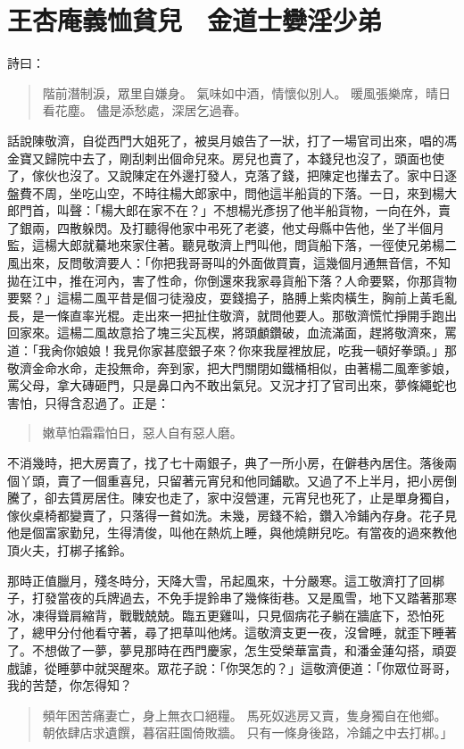 
\chapter{王杏庵義恤貧兒　金道士孌淫少弟}

詩曰：
\begin{quote}
階前潛制淚，眾里自嫌身。
氣味如中酒，情懷似別人。
暖風張樂席，晴日看花塵。
儘是添愁處，深居乞過春。
\end{quote}

話說陳敬濟，自從西門大姐死了，被吳月娘告了一狀，打了一場官司出來，唱的馮金寶又歸院中去了，剛刮剌出個命兒來。房兒也賣了，本錢兒也沒了，頭面也使了，傢伙也沒了。又說陳定在外邊打發人，克落了錢，把陳定也攆去了。家中日逐盤費不周，坐吃山空，不時往楊大郎家中，問他這半船貨的下落。一日，來到楊大郎門首，叫聲：「楊大郎在家不在？」不想楊光彥拐了他半船貨物，一向在外，賣了銀兩，四散躲閃。及打聽得他家中弔死了老婆，他丈母縣中告他，坐了半個月監，這楊大郎就驀地來家住著。聽見敬濟上門叫他，問貨船下落，一徑使兄弟楊二風出來，反問敬濟要人：「你把我哥哥叫的外面做買賣，這幾個月通無音信，不知拋在江中，推在河內，害了性命，你倒還來我家尋貨船下落？人命要緊，你那貨物要緊？」這楊二風平昔是個刁徒潑皮，耍錢搗子，胳膊上紫肉橫生，胸前上黃毛亂長，是一條直率光棍。走出來一把扯住敬濟，就問他要人。那敬濟慌忙掙開手跑出回家來。這楊二風故意拾了塊三尖瓦楔，將頭顱鑽破，血流滿面，趕將敬濟來，罵道：「我肏你娘娘！我見你家甚麼銀子來？你來我屋裡放屁，吃我一頓好拳頭。」那敬濟金命水命，走投無命，奔到家，把大門關閉如鐵桶相似，由著楊二風牽爹娘，罵父母，拿大磚砸門，只是鼻口內不敢出氣兒。又況才打了官司出來，夢條繩蛇也害怕，只得含忍過了。正是：
\begin{quote}
嫩草怕霜霜怕日，惡人自有惡人磨。
\end{quote}

不消幾時，把大房賣了，找了七十兩銀子，典了一所小房，在僻巷內居住。落後兩個丫頭，賣了一個重喜兒，只留著元宵兒和他同鋪歇。又過了不上半月，把小房倒騰了，卻去賃房居住。陳安也走了，家中沒營運，元宵兒也死了，止是單身獨自，傢伙桌椅都變賣了，只落得一貧如洗。未幾，房錢不給，鑽入冷鋪內存身。花子見他是個富家勤兒，生得清俊，叫他在熱炕上睡，與他燒餅兒吃。有當夜的過來教他頂火夫，打梆子搖鈴。

那時正值臘月，殘冬時分，天降大雪，吊起風來，十分嚴寒。這工敬濟打了回梆子，打發當夜的兵牌過去，不免手提鈴串了幾條街巷。又是風雪，地下又踏著那寒冰，凍得聳肩縮背，戰戰兢兢。臨五更雞叫，只見個病花子躺在牆底下，恐怕死了，總甲分付他看守著，尋了把草叫他烤。這敬濟支更一夜，沒曾睡，就歪下睡著了。不想做了一夢，夢見那時在西門慶家，怎生受榮華富貴，和潘金蓮勾搭，頑耍戲謔，從睡夢中就哭醒來。眾花子說：「你哭怎的？」這敬濟便道：「你眾位哥哥，我的苦楚，你怎得知？
\begin{quote}
頻年困苦痛妻亡，身上無衣口絕糧。
馬死奴逃房又賣，隻身獨自在他鄉。
朝依肆店求遺饌，暮宿莊園倚敗牆。
只有一條身後路，冷鋪之中去打梆。」
\end{quote}

